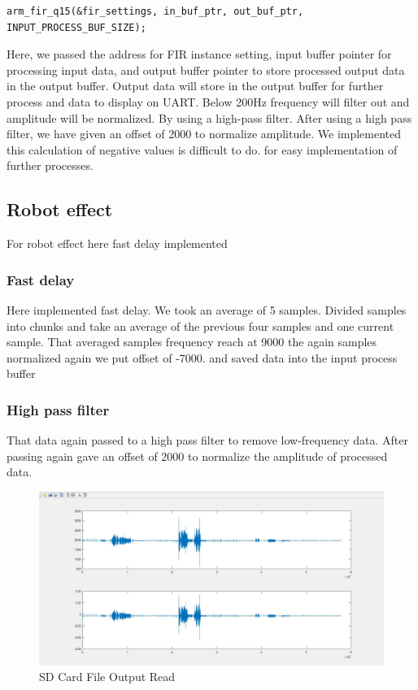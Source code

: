 \documentclass[11pt]{article}
\begin{document}
\begin{verbatim}
arm_fir_q15(&fir_settings, in_buf_ptr, out_buf_ptr, INPUT_PROCESS_BUF_SIZE);
\end{verbatim}

Here, we passed the address for FIR instance setting, input buffer pointer for processing input data, and output buffer pointer to store processed output data in the output buffer. Output data will store in the output buffer for further process and data to display on UART.
Below 200Hz frequency will filter out and amplitude will be normalized. By using a high-pass filter.
After using a high pass filter, we have given an offset of 2000 to normalize amplitude. We implemented this calculation of negative values is difficult to do. for easy implementation of further processes.

\subsection{Robot effect}
\label{sec:org091cd0a}
For robot effect here fast delay implemented

\subsubsection*{Fast delay}
\label{sec:org41fadc2}
Here implemented fast delay. We took an average of 5 samples. Divided samples into chunks and take an average of the previous four samples and one current sample.  That averaged samples frequency reach at 9000 the again samples normalized again we put offset of -7000. and saved data into the input process buffer
\subsubsection*{High pass filter}
\label{sec:org05f91bd}
That data again passed to a high pass filter to remove low-frequency data. After passing again gave an offset of 2000 to normalize the amplitude of processed data.

\begin{figure}[H]
    \centering
    \includegraphics[width=1\textwidth, trim={0cm 0cm 0cm 0cm}, clip]{SD_Read.pdf}
    \caption{SD Card File Output Read}
    \end{figure}
\end{document}
